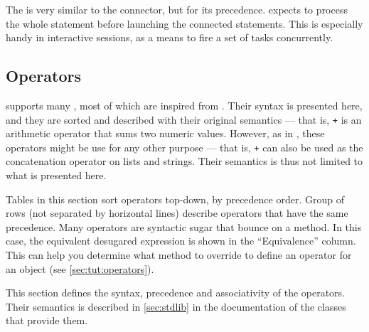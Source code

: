 \subsubsection{\samp{\&}}

The \samp{\&} is very similar to the \samp{,} connector, but for its
precedence.  \urbi expects to process the whole statement before
launching the connected statements.   This is especially handy in
interactive sessions, as a means to fire a set of tasks concurrently.


\subsection{Operators}

\us supports many , most of which are inspired from
\Cxx. Their syntax is presented here, and they are sorted and
described with their original semantics --- that is, \lstinline|+| is
an arithmetic operator that sums two numeric values. However, as in
\Cxx, these operators might be use for any other purpose --- that is,
\lstinline|+| can also be used as the concatenation operator on lists
and strings. Their semantics is thus not limited to what is presented
here.

Tables in this section sort operators top-down, by precedence order.
Group of rows (not separated by horizontal lines) describe operators
that have the same precedence. Many operators are syntactic sugar that
bounce on a method. In this case, the equivalent desugared expression
is shown in the ``Equivalence'' column. This can help you determine
what method to override to define an operator for an object (see
\autoref{sec:tut:operators}).

This section defines the syntax, precedence and associativity of the
operators. Their semantics is described in \autoref{sec:stdlib} in the
documentation of the classes that provide them.


\newcommand{\operator}[6][]{\lstinline@#2@&\lstinline@#3@&#4&#5&\lstinline@#6@#1}
\newcommand{\boperator}[3]{\operator{#1}{a #1 b}{#2}{#3}{a.'#1'(b)}}
\newcommand{\poperator}[3]{\operator{#1}{#1a}{#2}{#3}{a.'#1'()}}

\newcommand{\operatordot}    {\operator  {.}    {a.b}              {-}     {Message sending}        {Not redefinable}       }
\newcommand{\operatordota}   {\operator  {.}    {a.b(args)}        {-}     {Message sending}        {Not redefinable}       }
\newcommand{\operatorprop}   {\operator  {->}   {a->b}             {-}     {Property access}        {getProperty("a", "b")} }
\newcommand{\operatorpropass}{\operator  {->}   {a->b = v}         {-}     {Property assignment}    {setProperty("a", "b", v)}}
\newcommand{\operatorsub}    {\operator  {[]}   {a[args]}          {-}     {Subscript}              {a.'[]'(args)}          }
\newcommand{\operatorsubass} {\operator  {[] =} {a[args] = v}      {-}     {Subscript assignment}   {a.'[]='(args, v)}      }
\newcommand{\operatorass}[1][]{\operator[#1]
                                         {=}    {a = b}            {Right} {Assignment}             {updateSlot("a", b)}    }

